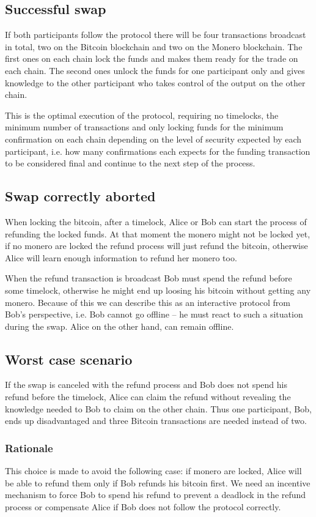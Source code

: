\documentclass{llncs}
\begin{document}
\subsection{Successful swap}
If both participants follow the protocol there will be four transactions broadcast in total, two on the Bitcoin blockchain and two on the Monero blockchain. The first ones on each chain lock the funds and makes them ready for the trade on each chain. The second ones unlock the funds for one participant only and gives knowledge to the other participant who takes control of the output on the other chain.

This is the optimal execution of the protocol, requiring no timelocks, the minimum number of transactions and only locking funds for the minimum confirmation on each chain depending on the level of security expected by each participant, i.e. how many confirmations each expects for the funding transaction to be considered final and continue to the next step of the process.

\subsection{Swap correctly aborted}
When locking the bitcoin, after a timelock, Alice or Bob can start the process of refunding the locked funds. At that moment the monero might not be locked yet, if no monero are locked the refund process will just refund the bitcoin, otherwise Alice will learn enough information to refund her monero too.

When the refund transaction is broadcast Bob must spend the refund before some timelock, otherwise he might end up loosing his bitcoin without getting any monero.  Because of this we can describe this as an interactive protocol from Bob's perspective, i.e. Bob cannot go offline -- he must react to such a situation during the swap. Alice on the other hand, can remain offline.

\subsection{Worst case scenario}
If the swap is canceled with the refund process and Bob does not spend his refund before the timelock, Alice can claim the refund without revealing the knowledge needed to Bob to claim on the other chain. Thus one participant, Bob, ends up disadvantaged and three Bitcoin transactions are needed instead of two.

\subsubsection{Rationale}
\label{worstCaseRationale}
This choice is made to avoid the following case: if monero are locked, Alice will be able to refund them only if Bob refunds his bitcoin first. We need an incentive mechanism to force Bob to spend his refund to prevent a deadlock in the refund process or compensate Alice if Bob does not follow the protocol correctly.
\end{document}
